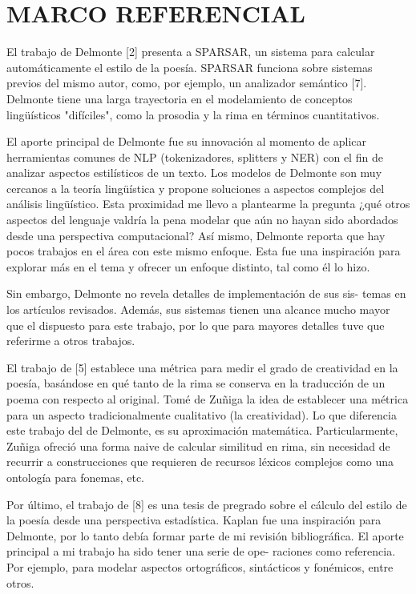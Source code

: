 \documentclass[twoside]{article}
\begin{document}
\section{MARCO REFERENCIAL}
\label{sec:org097c065}

El trabajo de Delmonte [2] presenta a SPARSAR, un sistema para calcular
automáticamente el estilo de la poesía. SPARSAR funciona sobre sistemas
previos del mismo autor, como, por ejemplo, un analizador semántico [7].
Delmonte tiene una larga trayectoria en el modelamiento de conceptos
lingüísticos "difíciles", como la prosodia y la rima en términos
cuantitativos.

El aporte principal de Delmonte fue su innovación al momento de aplicar
herramientas comunes de NLP (tokenizadores, splitters y NER) con el fin
de analizar aspectos estilísticos de un texto. Los modelos de Delmonte
son muy cercanos a la teoría lingüística y propone soluciones a aspectos
complejos del análisis lingüístico. Esta proximidad me llevo a
plantearme la pregunta ¿qué otros aspectos del lenguaje valdría la pena
modelar que aún no hayan sido abordados desde una perspectiva
computacional? Así mismo, Delmonte reporta que hay pocos trabajos en el
área con este mismo enfoque. Esta fue una inspiración para explorar más
en el tema y ofrecer un enfoque distinto, tal como él lo hizo.

Sin embargo, Delmonte no revela detalles de implementación de sus sis-
temas en los artículos revisados. Además, sus sistemas tienen una
alcance mucho mayor que el dispuesto para este trabajo, por lo que para
mayores detalles tuve que referirme a otros trabajos.

El trabajo de [5] establece una métrica para medir el grado de
creatividad en la poesía, basándose en qué tanto de la rima se conserva
en la traducción de un poema con respecto al original. Tomé de Zuñiga la
idea de establecer una métrica para un aspecto tradicionalmente
cualitativo (la creatividad). Lo que diferencia este trabajo del de
Delmonte, es su aproximación matemática. Particularmente, Zuñiga ofreció
una forma naive de calcular similitud en rima, sin necesidad de recurrir
a construcciones que requieren de recursos léxicos complejos como una
ontología para fonemas, etc.

Por último, el trabajo de [8] es una tesis de pregrado sobre el cálculo
del estilo de la poesía desde una perspectiva estadística. Kaplan fue
una inspiración para Delmonte, por lo tanto debía formar parte de mi
revisión bibliográfica. El aporte principal a mi trabajo ha sido tener
una serie de ope- raciones como referencia. Por ejemplo, para modelar
aspectos ortográficos, sintácticos y fonémicos, entre otros.
\end{document}
